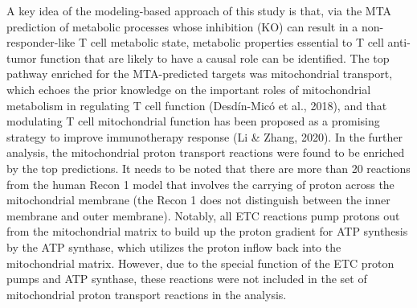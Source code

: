 \documentclass[12pt,twoside,openany,\mydriver]{thesis}  %
\begin{document}
A key idea of the modeling-based approach of this study is that, via the MTA prediction of metabolic processes whose inhibition (KO) can result in a non-responder-like T cell metabolic state, metabolic properties essential to T cell anti-tumor function that are likely to have a causal role can be identified. The top pathway enriched for the MTA-predicted targets was mitochondrial transport, which echoes the prior knowledge on the important roles of mitochondrial metabolism in regulating T cell function (Desdín-Micó et al., 2018), and that modulating T cell mitochondrial function has been proposed as a promising strategy to improve immunotherapy response (Li \& Zhang, 2020). In the further analysis, the mitochondrial proton transport reactions were found to be enriched by the top predictions. It needs to be noted that there are more than 20 reactions from the human Recon 1 model that involves the carrying of proton across the mitochondrial membrane (the Recon 1 does not distinguish between the inner membrane and outer membrane). Notably, all ETC reactions pump protons out from the mitochondrial matrix to build up the proton gradient for ATP synthesis by the ATP synthase, which utilizes the proton inflow back into the mitochondrial matrix. However, due to the special function of the ETC proton pumps and ATP synthase, these reactions were not included in the set of mitochondrial proton transport reactions in the analysis.
\end{document}
